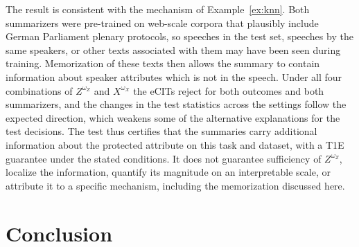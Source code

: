 \documentclass[twoside,11pt]{article}
\begin{document}
The result is consistent with the mechanism of Example~\ref{ex:knn}.
Both summarizers were pre-trained on web-scale corpora that plausibly include German Parliament plenary protocols, so speeches in the test set, speeches by the same speakers, or other texts associated with them may have been seen during training.
Memorization of these texts then allows the summary to contain information about speaker attributes which is not in the speech.
Under all four combinations of $Z^{\omega_Z}$ and $X^{\omega_X}$ the eCITs reject for both outcomes and both summarizers, and the changes in the test statistics across the settings follow the expected direction, which weakens some of the alternative explanations for the test decisions.
The test thus certifies that the summaries carry additional information about the protected attribute on this task and dataset, with a T1E guarantee under the stated conditions.
It does not guarantee sufficiency of $Z^{\omega_Z}$, localize the information, quantify its magnitude on an interpretable scale, or attribute it to a specific mechanism, including the memorization discussed here.

\section{Conclusion}
\end{document}
